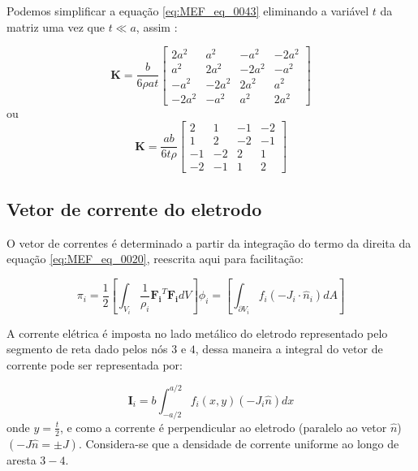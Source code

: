 \documentclass[
12pt,
a4paper,
oneside,
chapter=TITLE,
sumario=tradicional
]{abntex2}
\begin{document}
Podemos simplificar a equação \ref{eq:MEF_eq_0043} eliminando a variável $t$ da matriz uma vez que $t \ll a$, assim \cite{moura2013estimaccao}:

\begin{equation}
	\mathbf{K} =  
	\frac{b}{6\rho at}  
	\begin{bmatrix}  
		2a^2 & a^2 & -a^2 & -2a^2 \\  
		a^2 & 2a^2 & -2a^2 & -a^2 \\  
		-a^2 & -2a^2 & 2a^2 & a^2 \\  
		-2a^2 & -a^2 & a^2 & 2a^2  
	\end{bmatrix}  
	\label{eq:MEF_eq_0044}
\end{equation}
ou
\begin{equation}
	\mathbf{K} = \frac{ab}{6t\rho} \begin{bmatrix} 2 & 1 & -1 & -2 \\ 
		1 & 2 & -2 & -1 \\ 
		-1 & -2 & 2 & 1 \\ 
		-2 & -1 & 1 & 2 \end{bmatrix}
	\label{eq:MEF_eq_0045}
\end{equation}
\subsection{Vetor de corrente do eletrodo}

O vetor de correntes é determinado a partir da integração do termo da direita da equação \ref{eq:MEF_eq_0020}, reescrita aqui para facilitação:

\begin{equation*}
	\pi_i =
	\frac{1}{2}
	\left[\int_{V_i}\frac{1}{\rho_i}\mathbf{F_i}^{T}\mathbf{F_i} dV \right]
	\phi_i	=
	\left[\int_{\partial V_i} f_i (-J_i \cdot \hat{n}_i) dA \right]
\end{equation*} 

A corrente elétrica é imposta no lado metálico do eletrodo representado pelo segmento de reta dado pelos nós $3$ e $4$, dessa maneira a integral do vetor de corrente pode ser representada por: 

\begin{equation}
	\mathbf{I}_i = b \int_{-a/2}^{a/2} f_i(x, y)(-J_i \hat{n}) dx
	\label{eq:MEF_eq_0046}
\end{equation}
onde $y=\frac{t}{2}$, e como a corrente é perpendicular ao eletrodo (paralelo ao vetor $\hat{n}$)   $(-J \hat{n} = \pm J)$. Considera-se que a densidade de corrente uniforme ao longo de  aresta $3 - 4$.
 
\end{document}
